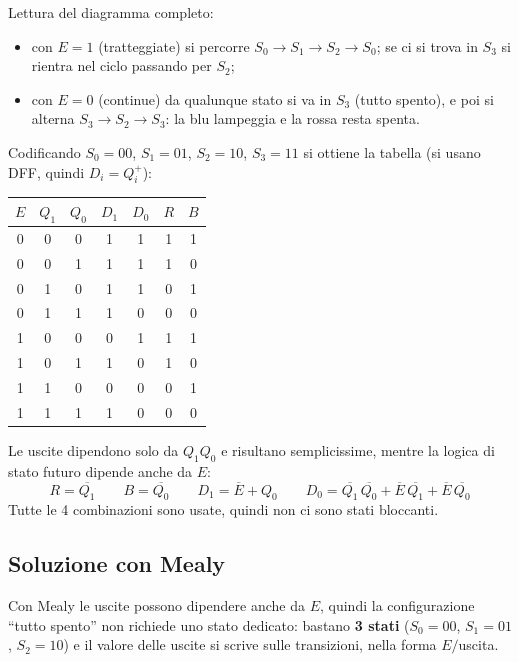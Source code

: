 \noindent Lettura del diagramma completo:
\begin{itemize}[leftmargin=1.5em, itemsep=1pt]
    \item con $E=1$ (tratteggiate) si percorre $S_0 \to S_1 \to S_2 \to S_0$; se ci si
          trova in $S_3$ si rientra nel ciclo passando per $S_2$;
    \item con $E=0$ (continue) da qualunque stato si va in $S_3$ (tutto spento), e poi si
          alterna $S_3 \to S_2 \to S_3$: la blu lampeggia e la rossa resta spenta.
\end{itemize}

\noindent Codificando $S_0=00$, $S_1=01$, $S_2=10$, $S_3=11$ si ottiene la tabella (si
usano DFF, quindi $D_i=Q_i^+$):

\begin{center}
\begin{tabular}{c|cc|cc|cc}
\toprule
$E$ & $Q_1$ & $Q_0$ & $D_1$ & $D_0$ & $R$ & $B$ \\
\midrule
0 & 0 & 0 & 1 & 1 & 1 & 1 \\
0 & 0 & 1 & 1 & 1 & 1 & 0 \\
0 & 1 & 0 & 1 & 1 & 0 & 1 \\
0 & 1 & 1 & 1 & 0 & 0 & 0 \\
\midrule
1 & 0 & 0 & 0 & 1 & 1 & 1 \\
1 & 0 & 1 & 1 & 0 & 1 & 0 \\
1 & 1 & 0 & 0 & 0 & 0 & 1 \\
1 & 1 & 1 & 1 & 0 & 0 & 0 \\
\bottomrule
\end{tabular}
\end{center}

\noindent Le uscite dipendono solo da $Q_1Q_0$ e risultano semplicissime, mentre la logica
di stato futuro dipende anche da $E$:
\[
R = \overline{Q_1} \qquad B = \overline{Q_0} \qquad
D_1 = \overline{E} + Q_0 \qquad
D_0 = \overline{Q_1}\,\overline{Q_0} + \overline{E}\,\overline{Q_1} + \overline{E}\,\overline{Q_0}
\]
Tutte le 4 combinazioni sono usate, quindi non ci sono stati bloccanti.

\subsection{Soluzione con Mealy}

Con Mealy le uscite possono dipendere anche da $E$, quindi la configurazione ``tutto
spento'' non richiede uno stato dedicato: bastano \textbf{3 stati} ($S_0=00$, $S_1=01$,
$S_2=10$) e il valore delle uscite si scrive sulle transizioni, nella forma $E/$uscita.

